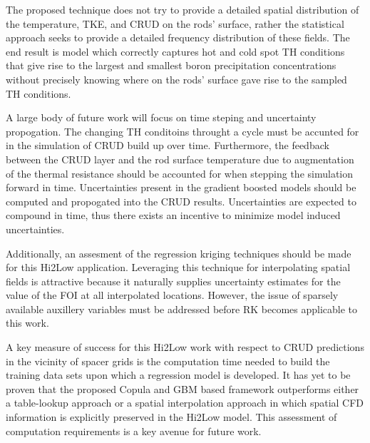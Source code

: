 
The proposed technique does not try to provide a detailed spatial distribution
of the temperature, TKE, and CRUD on the rods' surface, rather the
statistical approach seeks to provide a detailed frequency distribution
of these fields.  The end result is model which correctly captures hot and cold
spot TH conditions that give rise to the largest and smallest boron
precipitation concentrations without precisely knowing where on the rods'
surface gave rise to the sampled TH conditions.

A large body of future work will focus on time steping and uncertainty propogation.
The changing TH conditoins throught a cycle must be accunted for in the simulation of CRUD build up over time.  Furthermore, the feedback between the CRUD layer and the rod surface temperature due to augmentation of the thermal resistance should be accounted for when stepping the simulation forward in time.
Uncertainties present in the gradient boosted models should be computed and
propogated into the CRUD results.   Uncertainties are expected to compound in time, thus there exists an incentive to minimize model induced uncertainties.

Additionally, an assesment of the regression kriging techniques should be made for this Hi2Low application.  Leveraging this technique for interpolating spatial fields is attractive because it naturally supplies uncertainty estimates for the value of the FOI at all interpolated locations.  However, the issue of sparsely available auxillery variables must be addressed before RK becomes applicable to this work.

A key measure of success for this Hi2Low work with respect to  CRUD predictions
in the vicinity of spacer grids is the computation time needed to build the
training data sets upon which a regression model is developed.
It has yet to be proven that the proposed Copula and GBM based framework outperforms
either a table-lookup approach or a spatial interpolation approach in which
spatial CFD information is explicitly preserved in the Hi2Low model.  This assessment
of computation requirements is a key avenue for future work.